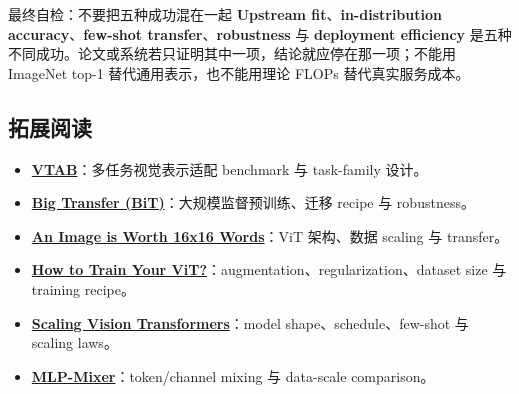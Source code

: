 \begin{warningbox}{最终自检：不要把五种成功混在一起}
\textbf{Upstream fit}、\textbf{in-distribution accuracy}、\textbf{few-shot transfer}、\textbf{robustness} 与 \textbf{deployment efficiency} 是五种不同成功。论文或系统若只证明其中一项，结论就应停在那一项；不能用 ImageNet top-1 替代通用表示，也不能用理论 FLOPs 替代真实服务成本。
\end{warningbox}

\subsection{拓展阅读}

{\small
\begin{itemize}[nosep,leftmargin=*]
  \item \href{https://arxiv.org/abs/1910.04867}{\textbf{VTAB}}：多任务视觉表示适配 benchmark 与 task-family 设计。
  \item \href{https://arxiv.org/abs/1912.11370}{\textbf{Big Transfer (BiT)}}：大规模监督预训练、迁移 recipe 与 robustness。
  \item \href{https://arxiv.org/abs/2010.11929}{\textbf{An Image is Worth 16x16 Words}}：ViT 架构、数据 scaling 与 transfer。
  \item \href{https://arxiv.org/abs/2106.10270}{\textbf{How to Train Your ViT?}}：augmentation、regularization、dataset size 与 training recipe。
  \item \href{https://arxiv.org/abs/2106.04560}{\textbf{Scaling Vision Transformers}}：model shape、schedule、few-shot 与 scaling laws。
  \item \href{https://arxiv.org/abs/2105.01601}{\textbf{MLP-Mixer}}：token/channel mixing 与 data-scale comparison。
\end{itemize}
}


